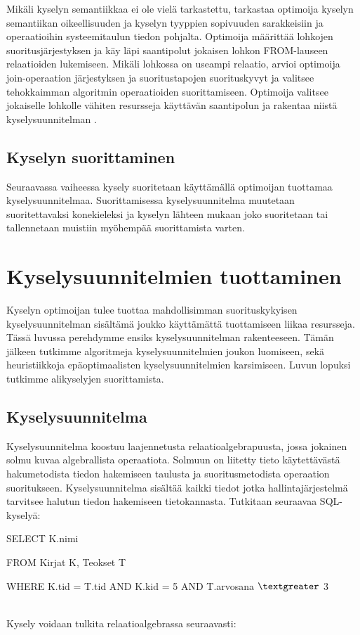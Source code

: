 \documentclass[finnish]{tktltiki2}
\theoremstyle{definition}
\theoremstyle{remark}
\begin{document}
Mikäli kyselyn semantiikkaa ei ole vielä tarkastettu, tarkastaa optimoija kyselyn semantiikan oikeellisuuden ja kyselyn tyyppien sopivuuden sarakkeisiin ja operaatioihin systeemitaulun tiedon pohjalta.  Optimoija määrittää lohkojen suoritusjärjestyksen ja käy läpi saantipolut jokaisen lohkon FROM-lauseen relaatioiden lukemiseen. Mikäli lohkossa on useampi relaatio, arvioi optimoija join-operaation järjestyksen ja suoritustapojen suorituskyvyt ja valitsee tehokkaimman algoritmin operaatioiden suorittamiseen. Optimoija valitsee jokaiselle lohkolle vähiten resursseja käyttävän saantipolun ja rakentaa niistä kyselysuunnitelman \cite{selinger1979access}.

\subsection{Kyselyn suorittaminen}
Seuraavassa vaiheessa kysely suoritetaan käyttämällä optimoijan tuottamaa kyselysuunnitelmaa. Suorittamisessa kyselysuunnitelma muutetaan suoritettavaksi konekieleksi ja kyselyn lähteen mukaan joko suoritetaan tai tallennetaan muistiin myöhempää suorittamista varten. 

\section{Kyselysuunnitelmien tuottaminen} 
Kyselyn optimoijan tulee tuottaa mahdollisimman suorituskykyisen kyselysuunnitelman sisältämä joukko käyttämättä tuottamiseen liikaa resursseja. Tässä luvussa perehdymme ensiks kyselysuunnitelman rakenteeseen. Tämän jälkeen tutkimme algoritmeja kyselysuunnitelmien joukon luomiseen, sekä heuristiikkoja epäoptimaalisten kyselysuunnitelmien karsimiseen. Luvun lopuksi tutkimme alikyselyjen suorittamista.

\subsection{Kyselysuunnitelma}
Kyselysuunnitelma koostuu laajennetusta relaatioalgebrapuusta, jossa jokainen solmu kuvaa algebrallista operaatiota. Solmuun on liitetty tieto käytettävästä hakumetodista tiedon hakemiseen taulusta ja suoritusmetodista operaation suoritukseen. Kyselysuunnitelma sisältää kaikki tiedot jotka hallintajärjestelmä tarvitsee halutun tiedon hakemiseen tietokannasta. Tutkitaan seuraavaa SQL-kyselyä:
\newline

\begin{frame}

SELECT K.nimi

FROM Kirjat K, Teokset T

WHERE K.tid = T.tid AND K.kid = 5 AND T.arvosana $\textgreater$  3
\end{frame}
\\\newline
Kysely voidaan tulkita relaatioalgebrassa seuraavasti:
\newline
\end{document}
